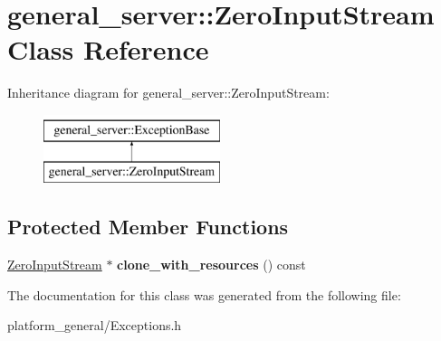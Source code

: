 \hypertarget{classgeneral__server_1_1ZeroInputStream}{\section{general\-\_\-server\-:\-:\-Zero\-Input\-Stream \-Class \-Reference}
\label{classgeneral__server_1_1ZeroInputStream}
}
\-Inheritance diagram for general\-\_\-server\-:\-:\-Zero\-Input\-Stream\-:\begin{figure}[H]
\begin{center}
\leavevmode
\includegraphics[height=2.000000cm]{classgeneral__server_1_1ZeroInputStream}
\end{center}
\end{figure}
\subsection*{\-Protected \-Member \-Functions}
\begin{DoxyCompactItemize}
\item 
\hypertarget{classgeneral__server_1_1ZeroInputStream_a2f9bbe4c68a42fc0c820a5098b8c450e}{\hyperlink{classgeneral__server_1_1ZeroInputStream}{\-Zero\-Input\-Stream} $\ast$ {\bfseries clone\-\_\-with\-\_\-resources} () const }\label{classgeneral__server_1_1ZeroInputStream_a2f9bbe4c68a42fc0c820a5098b8c450e}

\end{DoxyCompactItemize}


\-The documentation for this class was generated from the following file\-:\begin{DoxyCompactItemize}
\item 
platform\-\_\-general/\-Exceptions.\-h\end{DoxyCompactItemize}
